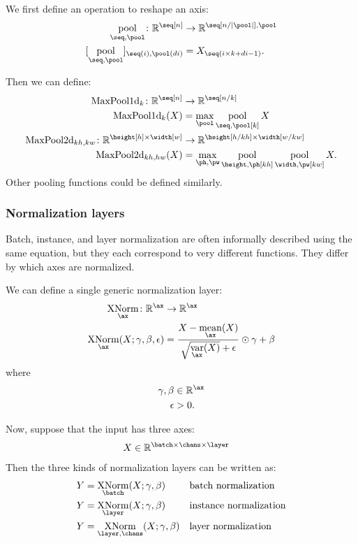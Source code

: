 \documentclass{article}
\newcommand{\reals}{\mathbb{R}}
\begin{document}
We first define an operation to reshape an axis:
\begin{align*}
\nfun{\seq,\pool}{pool} \colon \reals^{\seq[n]} &\rightarrow \reals^{\seq[n/|\pool|],\pool} \\
[\nfun{\seq,\pool}{pool}]_{\seq(i), \pool(di)} &= X_{\seq(i \times k + di -1)}.
\end{align*}

Then we can define:
\begin{align*}
\text{MaxPool1d}_{k} \colon \mathbb{R}^{\seq[n]} &\rightarrow \mathbb{R}^{\seq[n/k]} \\
\text{MaxPool1d}_{k}(X) &= \nfun{\pool}{max} \nfun{\seq,\pool[k]}{pool} X \\
\text{MaxPool2d}_{kh,kw} \colon \mathbb{R}^{\height[h] \times \width[w]} &\rightarrow \mathbb{R}^{\height[h/kh] \times \width[w/kw]} \\
\text{MaxPool2d}_{kh,hw}(X) &= \nfun{\ph,\pw}{max} \nfun{\height,\ph[kh]}{pool} \nfun{\width,\pw[kw]}{pool} X.
\end{align*}
Other pooling functions could be defined similarly.

\subsubsection{Normalization layers}

Batch, instance, and layer normalization are often informally described using the same
equation, but they each correspond to very different functions. They differ
by which axes are normalized.

We can define a single generic normalization layer:
\begin{align*}
  \nfun{\ax}{XNorm} \colon \mathbb{R}^{\ax} &\rightarrow \mathbb{R}^{\ax} \\
  \nfun{\ax}{XNorm}(X; \gamma, \beta, \epsilon) &= \frac{X - \nfun{\ax}{mean}(X)}{\sqrt{\nfun{\ax}{var}(X)} + \epsilon} \odot \gamma + \beta
\end{align*}
where
\begin{align*}
  \gamma, \beta &\in \mathbb{R}^{\ax} \\
  \epsilon &> 0.
\end{align*}

Now, suppose that the input has three axes:
\begin{align*}
X &\in \reals^{{\batch \times \chans \times \layer}}
\end{align*}
Then the three kinds of normalization layers can be written as:
\begin{align*}
Y &= \nfun{\batch}{XNorm}(X; \gamma, \beta) && \text{batch normalization} \\
Y &= \nfun{\layer}{XNorm}(X; \gamma, \beta) && \text{instance normalization} \\
Y &= \nfun{\layer,\chans}{XNorm}(X; \gamma, \beta) && \text{layer normalization}
\end{align*}
\end{document}
